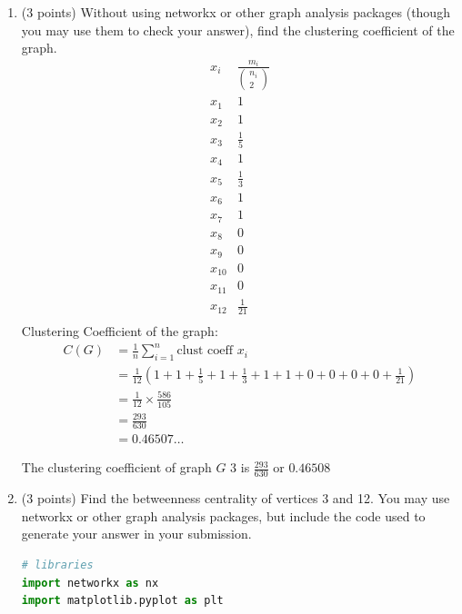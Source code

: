 \documentclass[11pt]{article}
\begin{document}
\begin{enumerate}
    \newpage
    \item (3 points) Without using networkx or other graph analysis packages
    (though you may use them to check your answer), find the clustering
    coefficient of the graph.
    $$
        \begin{matrix}
            x_i     &  \frac{ m_{i} }{ ( \substack{ n_{i} \\ 2} ) } \\
            x_1     &  1 \\
            x_2     &  1 \\
            x_3     &  \frac{1}{5} \\
            x_4     &  1 \\
            x_5     &  \frac{1}{3} \\
            x_6     &  1 \\
            x_7     &  1 \\
            x_8     &  0 \\
            x_9     &  0 \\
            x_{10}  &  0 \\
            x_{11}  &  0 \\
            x_{12}  &  \frac{1}{21} \\
        \end{matrix}
    $$
    Clustering Coefficient of the graph:
    \begin{align*}
        C(G) &= \frac{1}{n} \sum_{i=1}^{n} \text{clust coeff } x_i \\
        &= \frac{1}{12} ( 1 + 1 + \frac{1}{5} + 1 + \frac{1}{3} + 1 + 1 + 0 + 0 + 0 + 0 + \frac{1}{21} ) \\
        &= \frac{1}{12} \times \frac{586}{105}  \\
        &= \frac{293}{630} \\
        &= 0.46507\ldots
    \end{align*}
    \begin{tcolorbox}[width=\linewidth,title=Problem 4 Answer - Clustering Coefficient of graph $G$]
        The clustering coefficient of graph $G$ 3 is $\frac{293}{630}$ or $0.46508$
    \end{tcolorbox}


    \newpage
    \item (3 points) Find the betweenness centrality of vertices 3 and 12. You
    may use networkx or other graph analysis packages, but include the code used
    to generate your answer in your submission.
\begin{lstlisting}[language=Python]
# libraries
import networkx as nx
import matplotlib.pyplot as plt


\end{lstlisting}
\end{enumerate}
\end{document}
